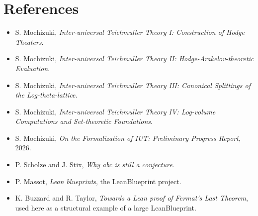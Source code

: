 \chapter{References}
\label{ch:references}

\begin{itemize}
\item S. Mochizuki, \emph{Inter-universal Teichmuller Theory I: Construction
  of Hodge Theaters}.
\item S. Mochizuki, \emph{Inter-universal Teichmuller Theory II:
  Hodge-Arakelov-theoretic Evaluation}.
\item S. Mochizuki, \emph{Inter-universal Teichmuller Theory III: Canonical
  Splittings of the Log-theta-lattice}.
\item S. Mochizuki, \emph{Inter-universal Teichmuller Theory IV:
  Log-volume Computations and Set-theoretic Foundations}.
\item S. Mochizuki, \emph{On the Formalization of IUT: Preliminary Progress
  Report}, 2026.
\item P. Scholze and J. Stix, \emph{Why abc is still a conjecture}.
\item P. Massot, \emph{Lean blueprints}, the LeanBlueprint project.
\item K. Buzzard and R. Taylor, \emph{Towards a Lean proof of Fermat's Last
  Theorem}, used here as a structural example of a large LeanBlueprint.
\end{itemize}
